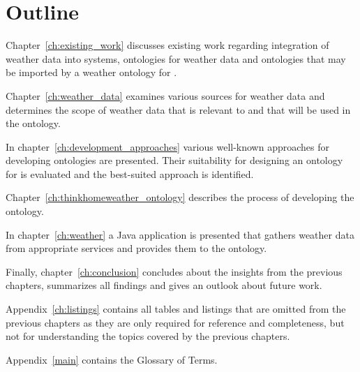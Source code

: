 
\section{Outline}

Chapter~\ref{ch:existing_work} discusses existing work regarding integration of weather data into \smarthome systems, ontologies for weather data and ontologies that may be imported by a weather ontology for \thinkhome.

Chapter~\ref{ch:weather_data} examines various sources for weather data and determines the scope of weather data that is relevant to \thinkhome and that will be used in the ontology.

In chapter~\ref{ch:development_approaches} various well-known approaches for developing ontologies are presented. Their suitability for designing an ontology for \thinkhome is evaluated and the best-suited approach is identified.

Chapter~\ref{ch:thinkhomeweather_ontology} describes the process of developing the ontology.

In chapter~\ref{ch:weather} a Java application is presented that gathers weather data from appropriate services and provides them to the \thinkhome ontology.

Finally, chapter~\ref{ch:conclusion} concludes about the insights from the previous chapters, summarizes all findings and gives an outlook about future work.

Appendix~\ref{ch:listings} contains all tables and listings that are omitted from the previous chapters as they are only required for reference and completeness, but not for understanding the topics covered by the previous chapters.

Appendix~\ref{main} contains the Glossary of Terms.

